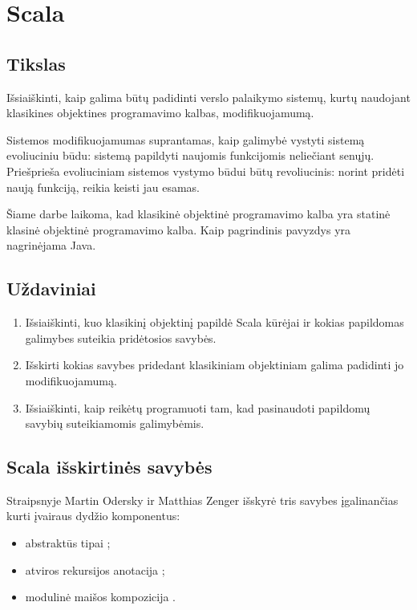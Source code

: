 \chapter{Scala}

\section{Tikslas}

Išsiaiškinti, kaip galima būtų padidinti verslo palaikymo sistemų, kurtų
naudojant klasikines objektines programavimo kalbas, modifikuojamumą.

Sistemos modifikuojamumas suprantamas, kaip galimybė vystyti sistemą
evoliuciniu būdu: sistemą papildyti naujomis funkcijomis neliečiant
senųjų. Priešprieša evoliuciniam sistemos vystymo būdui būtų
revoliucinis: norint pridėti naują funkciją, reikia keisti jau
esamas.

Šiame darbe laikoma, kad klasikinė objektinė programavimo kalba
yra statinė klasinė objektinė programavimo kalba. Kaip pagrindinis
pavyzdys yra nagrinėjama Java.

\section{Uždaviniai}

\begin{enumerate}
  \item Išsiaiškinti, kuo klasikinį objektinį papildė Scala
    kūrėjai ir kokias papildomas galimybes suteikia pridėtosios
    savybės.
  \item Išskirti kokias savybes pridedant klasikiniam objektiniam
    galima padidinti jo modifikuojamumą.
  \item Išsiaiškinti, kaip reikėtų programuoti tam, kad pasinaudoti
    papildomų savybių suteikiamomis galimybėmis.
\end{enumerate}

\section{Scala išskirtinės savybės}

Straipsnyje \cite{scalable-component-abstractions} Martin Odersky
ir Matthias Zenger išskyrė tris savybes įgalinančias kurti
įvairaus dydžio  komponentus:
\begin{itemize}
  \item abstraktūs tipai ;
  \item atviros rekursijos anotacija ;
  \item modulinė maišos kompozicija .
\end{itemize}

